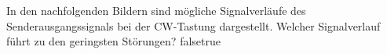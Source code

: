     {In den nachfolgenden Bildern sind mögliche Signalverläufe des Senderausgangssignals bei der CW-Tastung dargestellt. Welcher Signalverlauf führt zu den geringsten Störungen?}
    {}
    {}
    {}
    {}
    {false}{true}